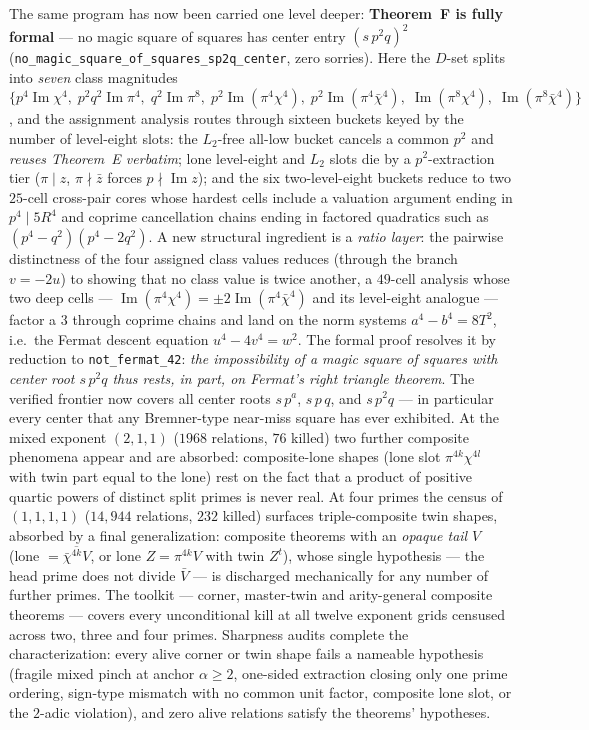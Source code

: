 \documentclass[11pt]{article}
\theoremstyle{remark}
\DeclareMathOperator{\im}{Im}
\begin{document}
The same program has now been carried one level deeper:
\textbf{Theorem~F is fully formal} --- no magic square of squares has
center entry $(s\,p^2 q)^2$
(\texttt{no\_magic\_square\_of\_squares\_sp2q\_center}, zero
sorries).  Here the $D$-set splits into \emph{seven} class magnitudes
$\{p^4\im\chi^4,\; p^2q^2\im\pi^4,\; q^2\im\pi^8,\;
p^2\im(\pi^4\chi^4),\; p^2\im(\pi^4\bar\chi^4),\;
\im(\pi^8\chi^4),\; \im(\pi^8\bar\chi^4)\}$, and the assignment
analysis routes through sixteen buckets keyed by the number of
level-eight slots: the $L_2$-free all-low bucket cancels a common
$p^2$ and \emph{reuses Theorem~E verbatim}; lone level-eight and
$L_2$ slots die by a $p^2$-extraction tier ($\pi \mid z$,
$\pi \nmid \bar z$ forces $p \nmid \im z$); and the six
two-level-eight buckets reduce to two $25$-cell cross-pair cores
whose hardest cells include a valuation argument ending in
$p^4 \mid 5R^4$ and coprime cancellation chains ending in factored
quadratics such as $(p^4-q^2)(p^4-2q^2)$.  A new structural
ingredient is a \emph{ratio layer}: the pairwise distinctness of the
four assigned class values reduces (through the branch $v = -2u$) to
showing that no class value is twice another, a $49$-cell analysis
whose two deep cells --- $\im(\pi^4\chi^4) = \pm 2\im(\pi^4\bar\chi^4)$
and its level-eight analogue --- factor a $3$ through coprime chains
and land on the norm systems $a^4 - b^4 = 8T^2$, i.e.\ the Fermat
descent equation $u^4 - 4v^4 = w^2$.  The formal proof resolves it by
reduction to \texttt{not\_fermat\_42}: \emph{the impossibility of a
magic square of squares with center root $s\,p^2q$ thus rests, in
part, on Fermat's right triangle theorem}.  The verified frontier now
covers all center roots $s\,p^a$, $s\,p\,q$, and $s\,p^2q$ ---
in particular every center that any Bremner-type near-miss square has
ever exhibited.
At the mixed exponent $(2,1,1)$ ($1968$ relations, $76$ killed) two
further composite phenomena appear and are absorbed: composite-lone
shapes (lone slot $\pi^{4k}\chi^{4l}$ with twin part equal to the
lone) rest on the fact that a product of positive quartic powers of
distinct split primes is never real.  At four primes the census of $(1,1,1,1)$ ($14{,}944$
relations, $232$ killed) surfaces triple-composite twin shapes,
absorbed by a final generalization: composite theorems with an
\emph{opaque tail} $V$ (lone $= \overline{\bar\chi^{4k}V}$, or lone
$Z = \pi^{4k}V$ with twin $Z^t$), whose single hypothesis — the head
prime does not divide $\bar V$ — is discharged mechanically for any
number of further primes.  The toolkit — corner, master-twin and
arity-general composite theorems — covers every unconditional kill at
all twelve exponent grids censused across two, three and four primes.
Sharpness audits complete the characterization: every alive corner or
twin shape fails a nameable hypothesis (fragile mixed pinch at anchor
$\alpha \ge 2$, one-sided extraction closing only one prime ordering,
sign-type mismatch with no common unit factor, composite lone slot, or
the $2$-adic violation), and zero alive relations satisfy the
theorems' hypotheses.
\end{document}
